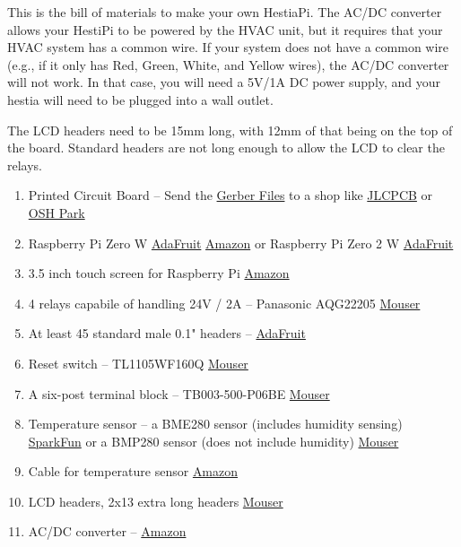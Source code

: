 This is the bill of materials to make your own HestiaPi.  The AC/DC converter
allows your HestiPi to be powered by the HVAC unit, but it requires that your
HVAC system has a common wire.  If your system does not have a common wire
(e.g., if it only has Red, Green, White, and Yellow wires), the AC/DC converter
will not work.  In that case, you will need a 5V/1A DC power supply, and your
hestia will need to be plugged into a wall outlet.

The LCD headers need to be 15mm long, with 12mm of that being on the top of the
board.  Standard headers are not long enough to allow the LCD to clear the
relays.

\begin{enumerate}
  \item Printed Circuit Board -- Send the 
        \href{https://github.com/HestiaPi/hestia-touch-pcb-dev/tree/master/HestiaPi-ONE/Gerber}{Gerber Files}
        to a shop like \href{https://jlcpcb.com/}{JLCPCB} or \href{https://oshpark.com/}{OSH Park}
  \item Raspberry Pi Zero W \href{https://www.adafruit.com/product/3400}{AdaFruit} \href{https://smile.amazon.com/Raspberry-Pi-Zero-Wireless-model/dp/B06XFZC3BX/}{Amazon} or Raspberry Pi Zero 2 W \href{https://www.adafruit.com/product/5291}{AdaFruit}
  \item 3.5 inch touch screen for Raspberry Pi \href{https://smile.amazon.com/gp/product/B01CNJVG8K/}{Amazon}
  \item 4 relays capabile of handling 24V / 2A -- Panasonic AQG22205 \href{https://www.mouser.com/ProductDetail/Panasonic-Industrial-Devices/AQG22205?qs=g5ciJ0jwZaGg6SiKVpMkMA%3D%3D}{Mouser}
  \item At least 45 standard male 0.1" headers -- \href{https://www.adafruit.com/product/3009}{AdaFruit}
  \item Reset switch -- TL1105WF160Q \href{https://www.mouser.com/ProductDetail/612-TL1105W}{Mouser}
  \item A six-post terminal block -- TB003-500-P06BE \href{https://www.mouser.com/ProductDetail/490-TB003-500-P06BE}{Mouser}
  \item Temperature sensor -- a BME280 sensor (includes humidity sensing) \href{https://www.sparkfun.com/products/13676}{SparkFun} or a BMP280 sensor (does not include humidity) \href{https://www.mouser.com/ProductDetail/426-SEN0372}{Mouser}
  \item Cable for temperature sensor \href{https://smile.amazon.com/dp/B0789F523N/}{Amazon}
  \item LCD headers, 2x13 extra long headers \href{https://www.mouser.com/ProductDetail/Samtec/TSW-113-14-T-D?qs=rU5fayqh%252BE3QNRUKTEZm%252BA%3D%3D}{Mouser}
  \item AC/DC converter -- \href{https://smile.amazon.com/dp/B00RE6QN4U/}{Amazon}
\end{enumerate}
